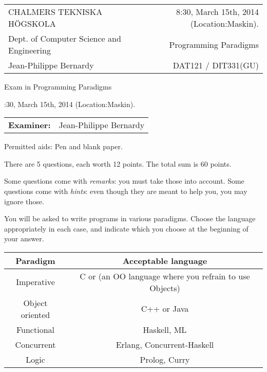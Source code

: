 \documentclass{article}
\begin{document}
\setlength{\parskip}{2pt}

\newcommand{\examtime}{8:30, March 15th, 2014  (Location:Maskin)}
\newcommand{\points}[1]{\marginpar{\bf #1 points}}
\noindent
\begin{tabular}{lr}
CHALMERS TEKNISKA H\"OGSKOLA &\examtime{}.\\
Dept. of Computer Science and Engineering & Programming Paradigms\\
Jean-Philippe Bernardy                 & DAT121 / DIT331(GU) \\
\end{tabular}

\vspace{2.5cm} \noindent
\begin{center} {\LARGE
Exam in Programming Paradigms}
\end{center}

\vspace{1.5cm}

\noindent
\examtime{}.\\
\begin{tabular}{ll}
\textbf{Examiner:} & Jean-Philippe Bernardy
\end{tabular}
\vspace{1cm}

\noindent
Permitted aids: Pen and blank paper.

There are 5 questions, each worth 12 points. The total sum is 60
points.

Some questions come with \emph{remarks}: you must take those
into account.
Some questions come with \emph{hints}: even though they are meant to help you, you may ignore those.

You will be asked to write programs in various paradigms. Choose the
language appropriately in each case, and indicate which you choose at
the beginning of your answer.

\begin{tabular}[p]{cc}
  Paradigm & Acceptable language \\ \hline
  Imperative   & C or (an OO language where you refrain to use Objects) \\
  Object oriented & C++ or Java \\
  Functional & Haskell, ML \\
  Concurrent & Erlang, Concurrent-Haskell \\
  Logic & Prolog, Curry
\end{tabular}
\end{document}
